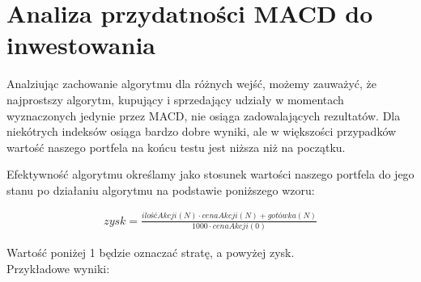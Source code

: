 \documentclass{article}
\begin{document}
\section{Analiza przydatności MACD do inwestowania}

    Analziując zachowanie algorytmu dla różnych wejść, możemy zauważyć, że najprostszy algorytm,
    kupujący i sprzedający udziały w momentach wyznaczonych jedynie przez MACD, nie osiąga zadowalających rezultatów. Dla niekótrych indeksów osiąga
    bardzo dobre wyniki, ale w większości przypadków wartość naszego portfela na końcu testu jest niższa niż na początku.

    
    Efektywność algorytmu określamy jako stosunek wartości naszego portfela
    do jego stanu po działaniu algorytmu na podstawie poniższego wzoru:

    \begin{align*} 
        zysk = \frac{\mathit{ilośćAkcji}(N) \cdot \mathit{cenaAkcji}(N) + \mathit{gotówka}(N)}{1000 \cdot \mathit{cenaAkcji}(0)}
    \end{align*}


    \noindent Wartość poniżej 1 będzie oznaczać stratę, a powyżej zysk.\\
    \noindent Przykładowe wyniki:
\end{document}
